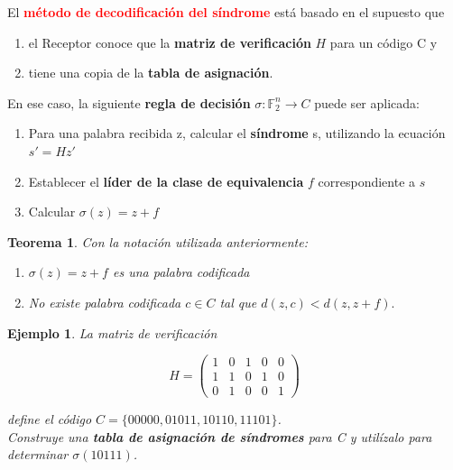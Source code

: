\documentclass{beamer}
\theoremstyle{plain}
\newtheorem{teorema} [Teorema] {Teorema}
\theoremstyle{example}
\theoremstyle{example}
\newtheorem{ejemplo} [Ejemplo] {Ejemplo}
\begin{document}
\begin{frame}  \small  

El \textcolor{red}{\textbf{método de decodificación del síndrome}} está basado en el supuesto que 
\begin{enumerate}
    \item el Receptor conoce que la \textbf{matriz de verificación} $H$ para un código C y
 \item  tiene una copia de la \textbf{tabla de asignación}.
\end{enumerate}

\vspace*{3pt}

En ese caso, la siguiente \textbf{regla de decisión} $\sigma:\mathbb{F}_2^n \rightarrow C$ puede ser aplicada:

\begin{enumerate}
\item Para una palabra recibida z, calcular el \textbf{síndrome} s, utilizando la ecuación $s'=Hz'$
\item Establecer el \textbf{líder de la clase de equivalencia} $f$ correspondiente a $s$
\item Calcular $\sigma(z)= z+f$
\end{enumerate}


\begin{teorema}

Con la notación utilizada anteriormente:
\begin{enumerate}
\item $\sigma(z)= z+f$ es una palabra codificada
\item No existe palabra codificada $c\in C$ tal que $d(z,c) < d(z,z + f).$
\end{enumerate}

\end{teorema}

\end{frame} 



\begin{frame}  \small  
\begin{ejemplo}

La matriz de verificación 

\[
   H=      \left( \begin{array}{ccccc}
                  1 & 0 & 1 & 0 & 0\\
                  1 & 1 & 0 & 1 & 0\\	  
                  0 & 1 & 0 & 0 & 1
           			\end{array}
    		\right) 	    		
\]

define el código $C = \{00000, 01011, 10110, 11101\}$.\\
\vspace*{13pt}
Construye una \textbf{tabla de asignación de síndromes} para C y utilízalo para determinar  $\sigma (10111)$.
\end{ejemplo}

\end{frame} 
\end{document}
